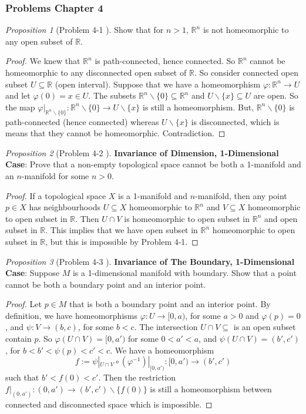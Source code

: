 \documentclass[a4paper]{article}
\theoremstyle{remark}
\newtheorem{prop}{Proposition}
\newcommand{\er}{\mathbb{R}} %
\newcommand{\rn}{\mathbb{R}^n} %
\newcommand{\subhim}{\subseteq} %
\begin{document}
\subsubsection*{Problems Chapter 4}

\begin{prop}[Problem 4-1 \cite{LeeTM}]
	Show that for $n>1$, $\rn$ is not homeomorphic to any open subset of $\er$.
\end{prop}
\begin{proof}
	We knew that $\rn$ is path-connected, hence connected. So $\rn$ cannot be homeomorphic to any disconnected open subset of $\er$. So consider connected open subset $U \subhim \er$ (open interval). Suppose that we have a homeomorphism $\varphi : \rn \to  U$ and let $\varphi(0) = x \in U$. The subsets $\rn \smallsetminus \{0\} \subhim \rn$ and $U \smallsetminus \{x\} \subhim U$ are open. So the map $\varphi|_{\rn \smallsetminus \{0\}} : \rn \smallsetminus \{0\} \to U \smallsetminus \{x\}$ is still a homeomorphism. But, $\rn \smallsetminus \{0\}$ is path-connected (hence connected) whereas $U \smallsetminus \{x\}$ is disconnected, which is means that they cannot be homeomorphic. Contradiction.
\end{proof}

\begin{prop}[Problem 4-2 \cite{LeeTM}]
	 \textbf{Invariance of Dimension, 1-Dimensional Case}: Prove that a non-empty topological space cannot be both a 1-manifold and an $n$-manifold for some $n>0$.
\end{prop}
\begin{proof}
	If a topological space $X$ is a 1-manifold and $n$-manifold, then any point $p\in X$ has neighbourhoods $U \subhim X$ homeomorphic to $\rn$ and $V\subhim X$ homeomorphic to open subset in $\er$. Then $U \cap V$ is homeomorphic to open subset in $\rn$ and open subset in $\er$. This implies that we have open subset in $\rn$ homeomorphic to open subset in $\er$, but this is impossible by Problem 4-1. 
 \end{proof}

\begin{prop}[Problem 4-3 \cite{LeeTM}]
	 \textbf{Invariance of The Boundary, 1-Dimensional Case}:
	Suppose $M$ is a 1-dimensional manifold with boundary. Show that a point cannot be both a boundary point and an interior point.
\end{prop}
\begin{proof}
	Let $p \in M$ that is both a boundary point and an interior point. By definition, we have homeomorphisms $\varphi : U \to [0,a)$, for some $a>0$ and $\varphi(p)=0$, and $\psi : V \to (b,c)$, for some $b<c$. The intersection $U \cap V \subhim$ is an open subset contain $p$. So $\varphi(U \cap V)= [0,a')$ for some $0<a'<a$, and $\psi(U \cap V) = (b',c')$, for $b<b'<\psi(p)<c'<c$. We have a homeomorphism 
	$$
	f:=\psi|_{U \cap V} \circ (\varphi^{-1})|_{[0,a')} : [0,a') \to (b',c')
	$$
	such that $b'<f(0)<c'$. Then the restriction $f|_{(0,a')} : (0,a') \to (b',c')\smallsetminus \{f(0)\}$ is still a homeomorphism between connected and disconnected space which is impossible.   
\end{proof}
\end{document}

